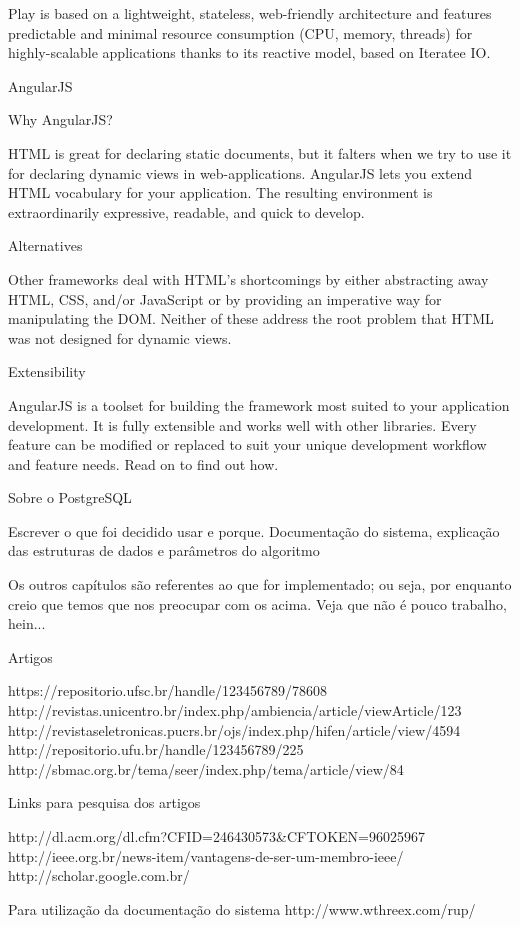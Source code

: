 \documentclass{article}
\begin{document}
Play is based on a lightweight, stateless, web-friendly architecture and features predictable and minimal resource consumption (CPU, memory, threads) for highly-scalable applications thanks to its reactive model, based on Iteratee IO.

AngularJS

Why AngularJS?

HTML is great for declaring static documents, but it falters when we try to use it for declaring dynamic views in web-applications. AngularJS lets you extend HTML vocabulary for your application. The resulting environment is extraordinarily expressive, readable, and quick to develop.

Alternatives

Other frameworks deal with HTML’s shortcomings by either abstracting away HTML, CSS, and/or JavaScript or by providing an imperative way for manipulating the DOM. Neither of these address the root problem that HTML was not designed for dynamic views.

Extensibility

AngularJS is a toolset for building the framework most suited to your application development. It is fully extensible and works well with other libraries. Every feature can be modified or replaced to suit your unique development workflow and feature needs. Read on to find out how.

Sobre o PostgreSQL



Escrever o que foi decidido usar e porque. Documentação do sistema,
explicação das estruturas de dados e parâmetros do algoritmo


Os outros capítulos são referentes ao que for implementado; ou seja,
por enquanto creio que temos que nos preocupar com os acima. Veja que
não é pouco trabalho, hein...




Artigos

https://repositorio.ufsc.br/handle/123456789/78608
http://revistas.unicentro.br/index.php/ambiencia/article/viewArticle/123
http://revistaseletronicas.pucrs.br/ojs/index.php/hifen/article/view/4594
http://repositorio.ufu.br/handle/123456789/225
http://sbmac.org.br/tema/seer/index.php/tema/article/view/84


Links para pesquisa dos artigos

http://dl.acm.org/dl.cfm?CFID=246430573&CFTOKEN=96025967
http://ieee.org.br/news-item/vantagens-de-ser-um-membro-ieee/
http://scholar.google.com.br/

Para utilização da documentação do sistema
http://www.wthreex.com/rup/
\end{document}
